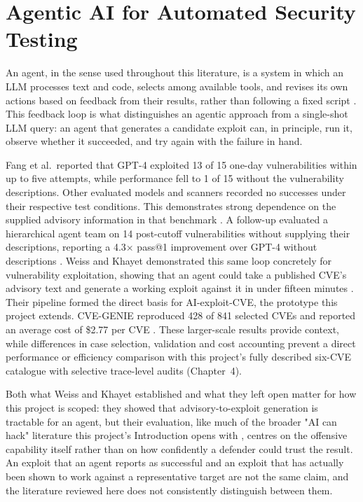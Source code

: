 \documentclass[12pt,a4paper]{report}
\begin{document}
\section{Agentic AI for Automated Security Testing}

An agent, in the sense used throughout this literature, is a system in which an LLM processes text and code, selects among available tools, and revises its own actions based on feedback from their results, rather than following a fixed script \cite{anthropic-agents}. This feedback loop is what distinguishes an agentic approach from a single-shot LLM query: an agent that generates a candidate exploit can, in principle, run it, observe whether it succeeded, and try again with the failure in hand.

Fang et al.\ reported that GPT-4 exploited 13 of 15 one-day vulnerabilities within up to five attempts, while performance fell to 1 of 15 without the vulnerability descriptions. Other evaluated models and scanners recorded no successes under their respective test conditions. This demonstrates strong dependence on the supplied advisory information in that benchmark \cite{fangkang}. A follow-up evaluated a hierarchical agent team on 14 post-cutoff vulnerabilities without supplying their descriptions, reporting a 4.3$\times$ pass@1 improvement over GPT-4 without descriptions \cite{fangkangzeroday}. Weiss and Khayet demonstrated this same loop concretely for vulnerability exploitation, showing that an agent could take a published CVE's advisory text and generate a working exploit against it in under fifteen minutes \cite{weiss-khayet}. Their pipeline formed the direct basis for AI-exploit-CVE, the prototype this project extends. CVE-GENIE reproduced 428 of 841 selected CVEs and reported an average cost of \$2.77 per CVE \cite{cvegenie}. These larger-scale results provide context, while differences in case selection, validation and cost accounting prevent a direct performance or efficiency comparison with this project's fully described six-CVE catalogue with selective trace-level audits (Chapter~4).

Both what Weiss and Khayet established and what they left open matter for how this project is scoped: they showed that advisory-to-exploit generation is tractable for an agent, but their evaluation, like much of the broader "AI can hack" literature this project's Introduction opens with \cite{openai-incident}, centres on the offensive capability itself rather than on how confidently a defender could trust the result. An exploit that an agent reports as successful and an exploit that has actually been shown to work against a representative target are not the same claim, and the literature reviewed here does not consistently distinguish between them.
\end{document}
